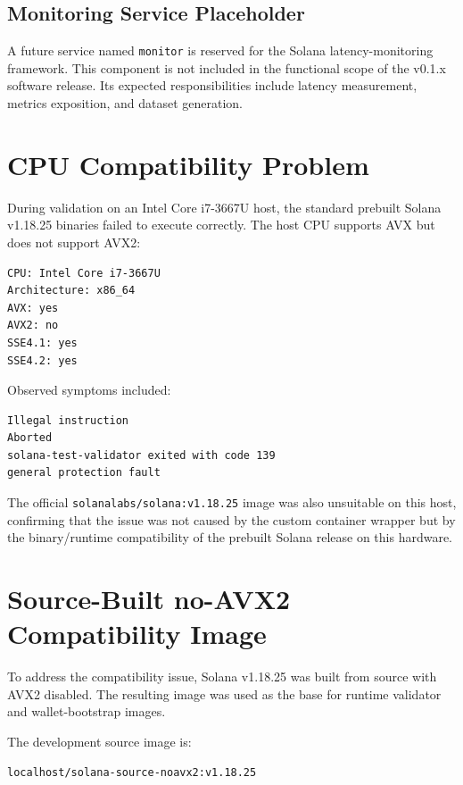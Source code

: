 \documentclass[11pt,a4paper]{article}
\begin{document}
\subsection{Monitoring Service Placeholder}

A future service named \texttt{monitor} is reserved for the Solana latency-monitoring framework. This component is not included in the functional scope of the v0.1.x software release. Its expected responsibilities include latency measurement, metrics exposition, and dataset generation.

\section{CPU Compatibility Problem}

During validation on an Intel Core i7-3667U host, the standard prebuilt Solana v1.18.25 binaries failed to execute correctly. The host CPU supports AVX but does not support AVX2:

\begin{lstlisting}
CPU: Intel Core i7-3667U
Architecture: x86_64
AVX: yes
AVX2: no
SSE4.1: yes
SSE4.2: yes
\end{lstlisting}

Observed symptoms included:

\begin{lstlisting}
Illegal instruction
Aborted
solana-test-validator exited with code 139
general protection fault
\end{lstlisting}

The official \texttt{solanalabs/solana:v1.18.25} image was also unsuitable on this host, confirming that the issue was not caused by the custom container wrapper but by the binary/runtime compatibility of the prebuilt Solana release on this hardware.

\section{Source-Built no-AVX2 Compatibility Image}

To address the compatibility issue, Solana v1.18.25 was built from source with AVX2 disabled. The resulting image was used as the base for runtime validator and wallet-bootstrap images.

The development source image is:

\begin{lstlisting}
localhost/solana-source-noavx2:v1.18.25
\end{lstlisting}
\end{document}
